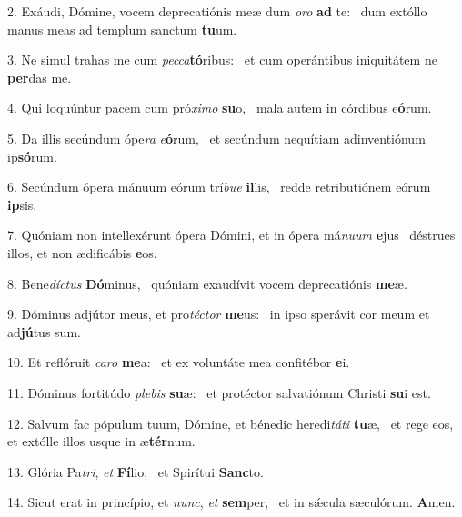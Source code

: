2. Exáudi, Dómine, vocem deprecatiónis meæ dum \textit{o}\textit{ro} \textbf{ad} te: \ast\  dum extóllo manus meas ad templum sanctum \textbf{tu}um.\

3. Ne simul trahas me cum \textit{pec}\textit{ca}\textbf{tó}ribus: \ast\  et cum operántibus iniquitátem ne \textbf{per}das me.\

4. Qui loquúntur pacem cum pró\textit{xi}\textit{mo} \textbf{su}o, \ast\  mala autem in córdibus e\textbf{ó}rum.\

5. Da illis secúndum ópe\textit{ra} \textit{e}\textbf{ó}rum, \ast\  et secúndum nequítiam adinventiónum ip\textbf{só}rum.\

6. Secúndum ópera mánuum eórum trí\textit{bu}\textit{e} \textbf{il}lis, \ast\  redde retributiónem eórum \textbf{ip}sis.\

7. Quóniam non intellexérunt ópera Dómini, et in ópera má\textit{nu}\textit{um} \textbf{e}jus \ast\  déstrues illos, et non ædificábis \textbf{e}os.\

8. Bene\textit{díc}\textit{tus} \textbf{Dó}minus, \ast\  quóniam exaudívit vocem deprecatiónis \textbf{me}æ.\

9. Dóminus adjútor meus, et pro\textit{téc}\textit{tor} \textbf{me}us: \ast\  in ipso sperávit cor meum et ad\textbf{jú}tus sum.\

10. Et reflóruit \textit{ca}\textit{ro} \textbf{me}a: \ast\  et ex voluntáte mea confitébor \textbf{e}i.\

11. Dóminus fortitúdo \textit{ple}\textit{bis} \textbf{su}æ: \ast\  et protéctor salvatiónum Christi \textbf{su}i est.\

12. Salvum fac pópulum tuum, Dómine, et bénedic heredi\textit{tá}\textit{ti} \textbf{tu}æ, \ast\  et rege eos, et extólle illos usque in æ\textbf{tér}num.\

13. Glória Pa\textit{tri}, \textit{et} \textbf{Fí}lio, \ast\  et Spirítui \textbf{Sanc}to.\

14. Sicut erat in princípio, et \textit{nunc}, \textit{et} \textbf{sem}per, \ast\  et in sǽcula sæculórum. \textbf{A}men.\

